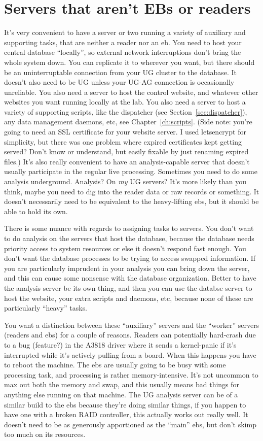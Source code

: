 \section{Servers that aren't EBs or readers}

It's very convenient to have a server or two running a variety of auxiliary and supporting tasks, that are neither a reader nor an eb.
You need to host your central database ``locally'', so external network interruptions don't bring the whole system down.
You can replicate it to wherever you want, but there should be an uninterruptable connection from your UG cluster to the database.
It doesn't also need to be UG unless your UG-AG connection is occasionally unreliable.
You also need a server to host the control website, and whatever other websites you want running locally at the lab.
You also need a server to host a variety of supporting scripts, like the dispatcher (see Section~\ref{sec:dispatcher}), any data management daemons, etc, see Chapter~\ref{ch:scripts}.
(Side note: you're going to need an SSL certificate for your website server.
I used letsencrypt for simplicity, but there was one problem where expired certificates kept getting served?
Don't know or understand, but easily fixable by just renaming expired files.)
It's also really convenient to have an analysis-capable server that doesn't usually participate in the regular live processing.
Sometimes you need to do some analysis underground.
Analysis?
On \emph{my} UG servers?
It's more likely than you think, maybe you need to dig into the reader data or raw records or something.
It doesn't necessarily need to be equivalent to the heavy-lifting ebs, but it should be able to hold its own.

There is some nuance with regards to assigning tasks to servers.
You don't want to do analysis on the servers that host the database, because the database needs priority access to system resources or else it doesn't respond fast enough.
You don't want the database processes to be trying to access swapped information.
If you are particularly imprudent in your analysis you can bring down the server, and this can cause some nonsense with the database organization.
Better to have the analysis server be its own thing, and then you can use the databse server to host the website, your extra scripts and daemons, etc, because none of these are particularly ``heavy'' tasks.

You want a distinction between these ``auxiliary'' servers and the ``worker'' servers (readers and ebs) for a couple of reasons.
Readers can potentially hard-crash due to a bug (feature?) in the A3818 driver where it sends a kernel-panic if it's interrupted while it's actively pulling from a board.
When this happens you have to reboot the machine.
The ebs are usually going to be busy with some processing task, and processing is rather memory-intensive.
It's not uncommon to max out both the memory and swap, and this usually means bad things for anything else running on that machine.
The UG analysis server can be of a similar build to the ebs because they're doing similar things, if you happen to have one with a broken RAID controller, this actually works out really well.
It doesn't need to be as generously apportioned as the ``main'' ebs, but don't skimp too much on its resources.

